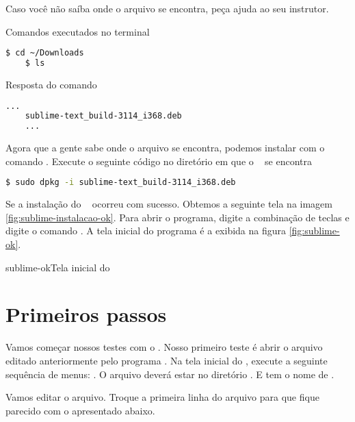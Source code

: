Caso você não saíba onde o arquivo se encontra, peça ajuda ao seu instrutor.

\begin{multicols}{2}

  Comandos executados no terminal 
  \begin{lstlisting}[language=bash,style=codigos]
    $ cd ~/Downloads
    $ ls
  \end{lstlisting}

  \columnbreak

  Resposta do comando \comandolscompleto
  \begin{lstlisting}[language=bash, style=codigos]
    ...  
    sublime-text_build-3114_i368.deb
    ...  
  \end{lstlisting}

\end{multicols}

Agora que a gente sabe onde o arquivo se encontra, podemos instalar com o comando
\dpkg. Execute o seguinte código no diretório em que o \sublimefilename~ se encontra

  \begin{lstlisting}[language=bash,style=codigos]
    $ sudo dpkg -i sublime-text_build-3114_i368.deb
  \end{lstlisting}

Se a instalação do \sublime~ ocorreu com sucesso. Obtemos a seguinte tela na 
imagem \ref{fig:sublime-instalacao-ok}. Para abrir o programa, digite a combinação 
de teclas \altfdois e digite o comando \sublimebin. A tela inicial do programa é 
a exibida na figura \ref{fig:sublime-ok}.

{sublime-ok}{Tela inicial do \sublime}

\section{Primeiros passos}
\label{primeiros-passos}

Vamos começar nossos testes com o \sublime. Nosso primeiro teste é abrir o arquivo 
editado anteriormente pelo programa \gedit. Na tela inicial do \sublime, execute a seguinte
sequência de menus: . O arquivo deverá estar no diretório
. E tem o nome de .

Vamos editar o arquivo. Troque a primeira linha do arquivo para que fique parecido com o
apresentado abaixo.

